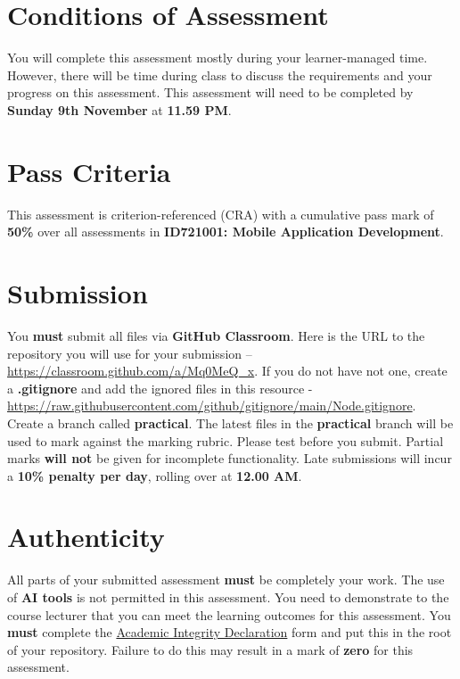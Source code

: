 \documentclass{article}
\begin{document}
\section*{Conditions of Assessment}
You will complete this assessment mostly during your learner-managed time. However, there will be time during class to discuss the requirements and your progress on this assessment. This assessment will need to be completed by \textbf{Sunday 9th November} at \textbf{11.59 PM}. 

\section*{Pass Criteria}
This assessment is criterion-referenced (CRA) with a cumulative pass mark of \textbf{50\%} over all assessments in \textbf{ID721001: Mobile Application Development}.

\section*{Submission}
You \textbf{must} submit all files via \textbf{GitHub Classroom}. Here is the URL to the repository you will use for your submission – \href{https://classroom.github.com/a/Mq0MeQ\_x}{https://classroom.github.com/a/Mq0MeQ\_x}. If you do not have not one, create a \textbf{.gitignore} and add the ignored files in this resource - \href{https://raw.githubusercontent.com/github/gitignore/main/Node.gitignore}{https://raw.githubusercontent.com/github/gitignore/main/Node.gitignore}. \\

Create a branch called \textbf{practical}. The latest files in the \textbf{practical} branch will be used to mark against the marking rubric. Please test before you submit. Partial marks \textbf{will not} be given for incomplete functionality. Late submissions will incur a \textbf{10\% penalty per day}, rolling over at \textbf{12.00 AM}.

\section*{Authenticity}
All parts of your submitted assessment \textbf{must} be completely your work. The use of \textbf{AI tools} is not permitted in this assessment. You need to demonstrate to the course lecturer that you can meet the learning outcomes for this assessment. You \textbf{must} complete the \href{https://moodle.op.ac.nz/mod/page/view.php?id=1178172}{Academic Integrity Declaration} form and put this in the root of your repository. Failure to do this may result in a mark of \textbf{zero} for this assessment.
\end{document}

